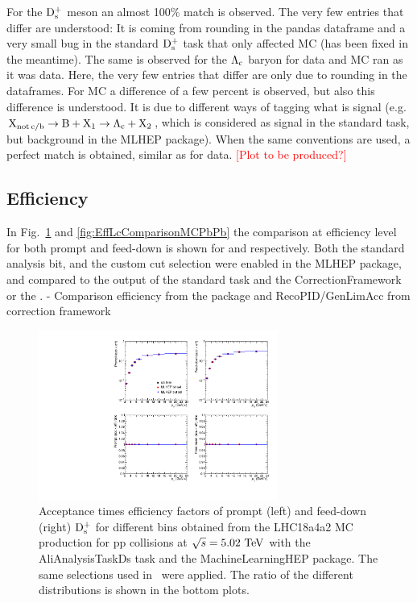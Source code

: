 For the $\rm D_s^+$ meson an almost 100\% match is observed. The very few entries that differ are understood: It is coming from rounding in the pandas dataframe and a very small bug in the standard $\rm D_s^+$ task that only affected MC (has been fixed in the meantime). The same is observed for the $\mbox{$\mathrm {\Lambda_{c}}$}$ baryon for data and MC ran as it was data. Here, the very few entries that differ are only due to rounding in the dataframes. For MC a difference of a few percent is observed, but also this difference is understood. It is due to different ways of tagging what is signal (e.g. ${\rm X}_{\rm not \, c/b} \rightarrow {\rm B} + {\rm X}_{1} \rightarrow \mbox{$\mathrm {\Lambda_{c}}$} + {\rm X}_{2}$, which is considered as signal in the standard task, but background in the MLHEP package). When the same conventions are used, a perfect match is obtained, similar as for data. \textcolor{red}{[Plot to be produced?]}

\subsection{Efficiency}
\label{subsec:effValidation}

In Fig.~\ref{fig:EffDsComparisonMCpp} and \ref{fig:EffLcComparisonMCPbPb} the comparison at efficiency level for both prompt and feed-down is shown for \Ds and \Lc respectively. Both the standard analysis bit, and the custom cut selection were enabled in the MLHEP package, and compared to the output of the standard \Ds task and the CorrectionFramework or the \Lc.
- Comparison efficiency from the package and RecoPID/GenLimAcc from correction framework

\begin{figure}[tb]
\begin{center}
\includegraphics[width=0.7\textwidth]{figures/DsEfficiencyComparison.pdf}
\caption{Acceptance times efficiency factors of prompt (left) and feed-down (right) $\rm D_s^+$ for different \pt bins obtained from the LHC18a4a2 MC production for pp collisions at $\sqrt{s}=5.02~\mathrm{TeV}$ with the AliAnalysisTaskDs task and the MachineLearningHEP package. The same selections used in~\cite{Acharya:2019mgn} were applied. The ratio of the different distributions is shown in the bottom plots.}
\label{fig:EffDsComparisonMCpp} 
\end{center}
\end{figure}

